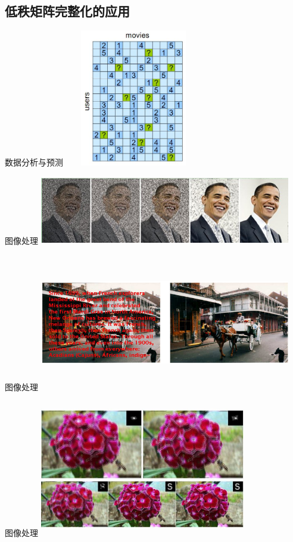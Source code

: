 \documentclass[slidestop, compress, mathserif, UTF8]{beamer}
\numberwithin{equation}{section}                                        %
\begin{document}
		\subsection{低秩矩阵完整化的应用}
			\begin{frame}[t]{数据分析与预测}
				\centering
					\includegraphics[width=6cm,height=6cm]{src//3.jpg}
			\end{frame}
			\begin{frame}[t]{图像处理}
				\vspace{2cm}
				\centering
					\includegraphics[width=11cm,height=3cm]{src//1.jpg}
			\end{frame}
			\begin{frame}[t]{图像处理}
				\vspace{0.5cm}
				\centering
					\includegraphics[width=11cm,height=6cm]{src//2.jpg}
			\end{frame}
			\begin{frame}[t]{图像处理}
				\vspace{0.5cm}
				\centering
					\includegraphics[width=9cm,height=6cm]{src//4.jpg}
			\end{frame}
\end{document}
